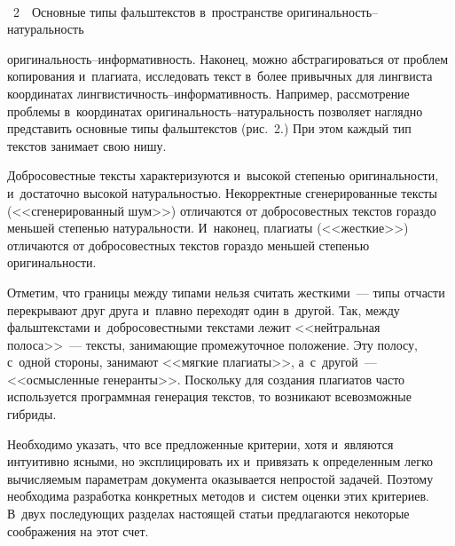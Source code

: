 \begin{multicols}{2}
\columnbreak

\begin{center}  %
\vspace*{1pt}
 \mbox{%
 \epsfxsize=76.684mm
 }

 \end{center}

 \vspace*{-9pt}


\noindent
{{\figurename~2}\ \ \small{Основные типы фальштекстов в~пространстве
   оригинальность--натуральность}}


\vspace*{14pt}



\noindent
   оригиналь\-ность--ин\-фор\-ма\-тив\-ность. Наконец,
можно
абстрагироваться от проблем копирования
 и~плагиата, исследовать текст
в~более привычных для лингвиста координатах
   лингви\-стич\-ность--ин\-фор\-ма\-тив\-ность. Например, рассмотрение
проблемы в~координатах ори\-ги\-наль\-ность--на\-ту\-раль\-ность позволяет
наглядно представить основные типы фальштекстов (рис.~2.)
   При этом каждый тип текстов занимает свою нишу.


   Добросовестные
тексты характеризуются и~высокой степенью оригинальности, и~достаточно\linebreak
высокой натуральностью. Некорректные сгенерированные тексты
(<<сгенерированный шум>>) отличаются от добросовестных текстов гораздо
меньшей степенью натуральности. И~наконец, плагиаты (<<жесткие>>)
отличаются от добросовестных текстов гораздо меньшей степенью
оригинальности.

   Отметим, что границы между типами нельзя считать жесткими~--- типы
отчасти перекрывают друг друга и~плавно переходят один в~другой. Так,
между фальштекстами и~добросовестными текстами лежит <<нейтральная
полоса>>~--- тексты, занимающие промежуточное положение. Эту полосу,
с~одной стороны, занимают <<мягкие плагиаты>>, а~с~другой~---
<<осмысленные генеранты>>. Поскольку для создания плагиатов часто
используется про\-грам\-мная генерация текстов, то возникают всевозможные
гибриды.

   Необходимо указать, что все предложенные критерии, хотя и~являются
интуитивно ясными, но эксплицировать их и~привязать к определенным
легко вычисляемым параметрам документа оказывается непростой задачей.
Поэтому необходима разработка конкретных методов и~систем оценки этих
критериев. В~двух последующих разделах настоящей статьи предлагаются
некоторые соображения на этот счет.


\end{multicols}
